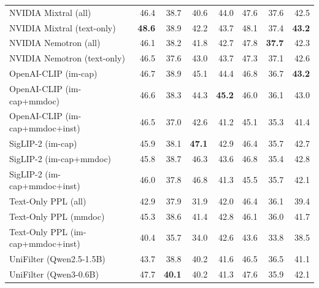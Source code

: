 \begin{table}[t]
\begin{tabular}{lrrrrrrr}
NVIDIA Mixtral (all) & 46.4 & 38.7 & 40.6 & 44.0 & 47.6 & 37.6 & 42.5 \\
NVIDIA Mixtral (text-only) & \textbf{48.6} & 38.9 & 42.2 & 43.7 & 48.1 & 37.4 & \textbf{43.2} \\
NVIDIA Nemotron (all) & 46.1 & 38.2 & 41.8 & 42.7 & 47.8 & \textbf{37.7} & 42.3 \\
NVIDIA Nemotron (text-only) & 46.5 & 37.6 & 43.0 & 43.7 & 47.3 & 37.1 & 42.6 \\
OpenAI-CLIP (im-cap) & 46.7 & 38.9 & 45.1 & 44.4 & 46.8 & 36.7 & \textbf{43.2} \\
OpenAI-CLIP (im-cap+mmdoc) & 46.6 & 38.3 & 44.3 & \textbf{45.2} & 46.0 & 36.1 & 43.0 \\
OpenAI-CLIP (im-cap+mmdoc+inst) & 46.5 & 37.0 & 42.6 & 41.2 & 45.1 & 35.3 & 41.4 \\
SigLIP-2 (im-cap) & 45.9 & 38.1 & \textbf{47.1} & 42.9 & 46.4 & 35.7 & 42.7 \\
SigLIP-2 (im-cap+mmdoc) & 45.8 & 38.7 & 46.3 & 43.6 & 46.8 & 35.4 & 42.8 \\
SigLIP-2 (im-cap+mmdoc+inst) & 46.0 & 37.8 & 46.8 & 41.3 & 45.5 & 35.7 & 42.1 \\
Text-Only PPL (all) & 42.9 & 37.9 & 31.9 & 42.0 & 46.4 & 36.1 & 39.4 \\
Text-Only PPL (mmdoc) & 45.3 & 38.6 & 41.4 & 42.8 & 46.1 & 36.0 & 41.7 \\
Text-Only PPL (im-cap+mmdoc+inst) & 40.4 & 35.7 & 34.0 & 42.6 & 43.6 & 33.8 & 38.5 \\
UniFilter (Qwen2.5-1.5B) & 43.7 & 38.8 & 40.2 & 41.6 & 46.5 & 36.5 & 41.1 \\
UniFilter (Qwen3-0.6B) & 47.7 & \textbf{40.1} & 40.2 & 41.3 & 47.6 & 35.9 & 42.1 \\
\bottomrule
\end{tabular}
\end{table}


